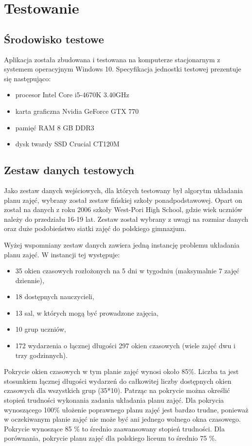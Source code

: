 \chapter{Testowanie}

\section{Środowisko testowe}

Aplikacja została zbudowana i testowana na komputerze stacjonarnym z systemem operacyjnym Windows 10. Specyfikacja jednostki testowej prezentuje się następująco:

\begin{itemize}
\item procesor Intel Core i5-4670K 3.40GHz
\item karta graficzna Nvidia GeForce GTX 770
\item pamięć RAM 8 GB DDR3
\item dysk twardy SSD Crucial CT120M
\end{itemize}

\section{Zestaw danych testowych}

Jako zestaw danych wejściowych, dla których testowany był algorytm układania planu zajęć, wybrany został zestaw fińskiej szkoły ponadpodstawowej. Opart on został na danych z roku 2006 szkoły West-Pori High School, gdzie wiek uczniów należy do przedziału 16-19 lat. Zestaw został wybrany z uwagi na rozmiar danych oraz duże podobieństwo siatki zajęć do polskiego gimnazjum.

Wyżej wspomniany zestaw danych zawiera jedną instancję problemu układania planu zajęć. W instancji tej występuje:

\begin{itemize}
\item 35 okien czasowych rozłożonych na 5 dni w tygodniu (maksymalnie 7 zajęć dziennie),
\item 18 dostępnych nauczycieli,
\item 13 sal, w których mogą być prowadzone zajęcia,
\item 10 grup uczniów,
\item 172 wydarzenia o łącznej długości 297 okien czasowych (wiele zajęć dwu i trzy godzinnych).
\end{itemize}

Pokrycie okien czasowych w tym planie zajęć wynosi około 85\%. Liczba ta jest stosunkiem łącznej długości wydarzeń do całkowitej liczby dostępnych okien czasowych dla wszystkich grup (35*10). Patrząc na pokrycie można określić stopień trudności wykonania zadania układania planu zajęć. Dla pokrycia wynoszącego 100\% ułożenie poprawnego planu zajęć jest bardzo trudne, ponieważ w oczekiwanym planie zajęć nie może być ani jednego wolnego okna czasowego. Pokrycie wynoszące 85 \% to średnio zaawansowany stopień trudności. Dla porównania, pokrycie planu zajęć dla polskiego liceum to średnio 75 \%.

